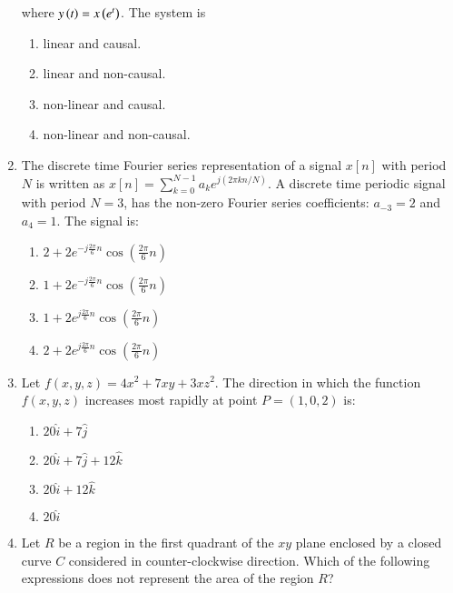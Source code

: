 \documentclass[journal,12pt,onecolumn]{IEEEtran}
\theoremstyle{remark}
\begin{document}
\begin{enumerate}
\begin{figure}[!ht]
\label{fig:my_label}
\end{figure}
where $y\left(t\right) = x\left(e^t\right)$. The system is
\begin{enumerate}
    \item linear and causal.
    \item linear and non-causal. 
    \item non-linear and causal. 
    \item non-linear and non-causal.
\end{enumerate}

\item The discrete time Fourier series representation of a signal $x[n]$ with period $N$ is written as  $x[n] = \sum_{k=0}^{N-1} a_k e^{j(2\pi kn / N)}.$ A discrete time periodic signal with period $N=3$, has the non-zero Fourier series coefficients: $a_{-3} = 2$ and $a_4 = 1$. The signal is:
\begin{enumerate}
    \item $2 + 2e^{-j\frac{2\pi}{6}n} \cos\left(\frac{2\pi}{6}n\right)$
    \item $1 + 2e^{-j\frac{2\pi}{6}n} \cos\left(\frac{2\pi}{6}n\right)$
    \item $1 + 2e^{j\frac{2\pi}{6}n} \cos\left(\frac{2\pi}{6}n\right)$
    \item $2 + 2e^{j\frac{2\pi}{6}n} \cos\left(\frac{2\pi}{6}n\right)$
\end{enumerate}

\item Let $f(x, y, z) = 4x^2 + 7xy + 3xz^2$. The direction in which the function $f(x, y, z)$ increases most rapidly at point $P = (1, 0, 2)$ is:
\begin{enumerate}
    \item $20\hat{i} + 7\hat{j}$
    \item $20\hat{i} + 7\hat{j} + 12\hat{k}$
    \item $20\hat{i} + 12\hat{k}$
    \item $20\hat{i}$
\end{enumerate}

\item Let $R$ be a region in the first quadrant of the $xy$ plane enclosed by a closed curve $C$ considered in counter-clockwise direction. Which of the following expressions does not represent the area of the region $R$?
\begin{figure}[!ht]
\centering
{}%


\end{figure}
\end{enumerate}
\end{document}
